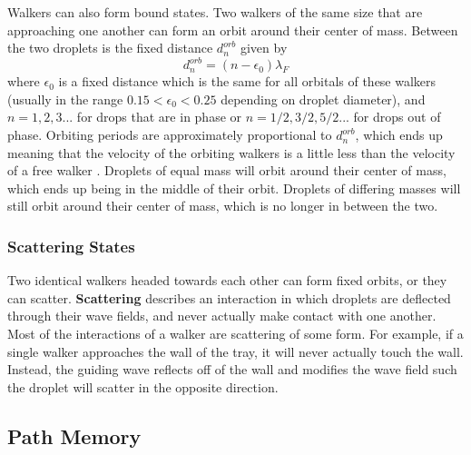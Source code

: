             Walkers can also form bound states. Two walkers of the same size that are approaching one another can form an orbit around their center of mass. Between the two droplets is the fixed distance $d_{n}^{orb}$ given by          
\begin{equation} \label{orbital}
d_{n}^{orb} = (n - \epsilon_0)\lambda_F
\end{equation}         
where $\epsilon_0$ is a fixed distance which is the same for all orbitals of these walkers (usually in the range $0.15 < \epsilon_0 < 0.25$ depending on droplet diameter), and $n = 1,2,3$... for drops that are in phase or $n = 1/2, 3/2, 5/2$... for drops out of phase. Orbiting periods are approximately proportional to $d_{n}^{orb}$, which ends up meaning that the velocity of the orbiting walkers is a little less than the velocity of a free walker . Droplets of equal mass will orbit around their center of mass, which ends up being in the middle of their orbit. Droplets of differing masses will still orbit around their center of mass, which is no longer in between the two.    

            \subsubsection{Scattering States}
            Two identical walkers headed towards each other can form fixed orbits, or they can scatter. \textbf{Scattering} describes an interaction in which droplets are deflected through their wave fields, and never actually make contact with one another. Most of the interactions of a walker are scattering of some form. For example, if a single walker approaches the wall of the tray, it will never actually touch the wall. Instead, the guiding wave reflects off of the wall and modifies the wave field such the droplet will scatter in the opposite direction.           



 
            \subsection{Path Memory}
                        
